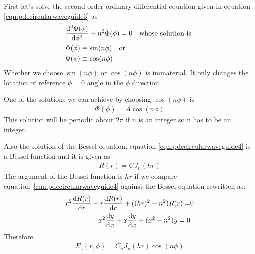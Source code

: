 First let's solve the second-order ordinary differential equation given in equation \ref{eqn:pdecircularwaveguide3} as
\begin{align*}
&\derivative[2]{\Phi(\phi)}{\phi} + n^2\Phi(\phi) = 0\quad\text{whose solution is }\\
&\Phi(\phi)\equiv\sin(n\phi)\quad\text{or}\\
&\Phi(\phi)\equiv\cos(n\phi)
\end{align*}
Whether we choose $\sin(n\phi)$ or $\cos(n\phi)$ is immaterial. It only changes the location of reference $\phi=0$ angle in the $\phi$ direction.

One of the solutions we can achieve by choosing $\cos(n\phi)$ is
\begin{align*}
\Phi(\phi)=A\cos(n\phi)
\end{align*}
This solution will be periodic about $2\pi$ if n is an integer so n has to be an integer.
  
Also the solution of the Bessel equation, equation \ref{eqn:pdecircularwaveguide4} is a Bessel function and it is given as
\begin{align*}
R(r)=CJ_n(hr)
\end{align*}
The argument of the Bessel function is $hr$ if we compare equation~\eqref{eqn:pdecircularwaveguide4} against the Bessel equation rewritten as:
\begin{align*}
r^2\derivative{R(r)}{r} + r\derivative{R(r)}{r} + ((hr)^2 - n^2)R(r) =& 0\\
x^2\derivative{y}{x} + x\derivative{y}{x} + (x^2-n^2)y=0
\end{align*}
Therefore
\begin{align}
E_z(r,\phi) = C_nJ_n(hr)\cos(n\phi)\label{eqn:electricfieldsoln}
\end{align}

